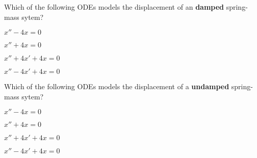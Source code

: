 \begin{readinessAssuranceTest}
\item Which of the following ODEs models the displacement of an \textbf{damped} spring-mass sytem?
\begin{multicols}{4}
\begin{readinessAssuranceTestChoices}
\item \(x''-4x=0\)
\item \(x''+4x=0\) 
\item \(x''+4x'+4x=0\) %
\item \(x''-4x'+4x=0\) 
\end{readinessAssuranceTestChoices}
\end{multicols}
\vfill

\item Which of the following ODEs models the displacement of a \textbf{undamped} spring-mass sytem?
\begin{multicols}{4}
\begin{readinessAssuranceTestChoices}
\item \(x''-4x=0\)
\item \(x''+4x=0\) %
\item \(x''+4x'+4x=0\) 
\item \(x''-4x'+4x=0\) 
\end{readinessAssuranceTestChoices}
\end{multicols}
\vfill

\end{readinessAssuranceTest}
